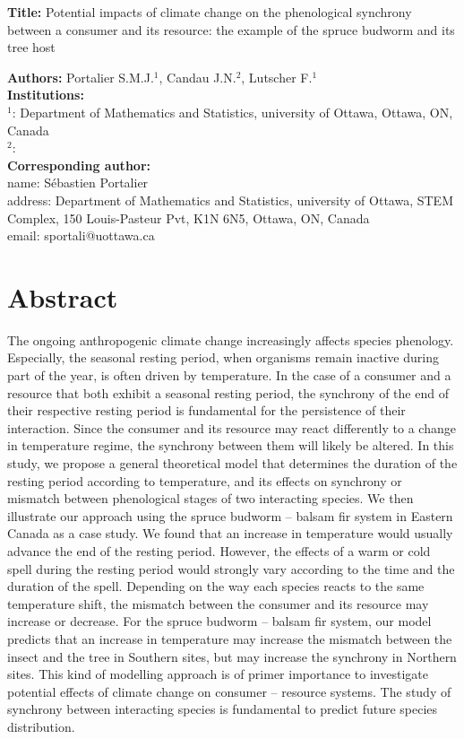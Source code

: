 \documentclass[12 pt]{article}
\begin{document}
\begin{Large}
\noindent \textbf{Title:} Potential impacts of climate change on the phenological synchrony between a consumer and its resource: the example of the spruce budworm and its tree host 
\end{Large}
\vspace{1 cm}

\noindent \textbf{Authors:} Portalier S.M.J.$^{1}$, Candau J.N.$^2$, Lutscher F.$^1$ \\
\textbf{Institutions:} \\
$^1$: Department of Mathematics and Statistics, university of Ottawa, Ottawa, ON, Canada \\
$^2$: \\
\textbf{Corresponding author:} \\
name: S\'ebastien Portalier \\
address: Department of Mathematics and Statistics, university of Ottawa, STEM Complex, 150 Louis-Pasteur Pvt, K1N 6N5, Ottawa, ON, Canada \\
email: sportali@uottawa.ca \\

\clearpage

\section*{Abstract}
The ongoing anthropogenic climate change increasingly affects species phenology. Especially, the seasonal resting period, when organisms remain inactive during part of the year, is often driven by temperature. In the case of a consumer and a resource that both exhibit a seasonal resting period, the synchrony of the end of their respective resting period is fundamental for the persistence of their interaction. Since the consumer and its resource may react differently to a change in temperature regime, the synchrony between them will likely be altered. In this study, we propose a general theoretical model that determines the duration of the resting period according to temperature, and its effects on synchrony or mismatch between phenological stages of two interacting species. We then illustrate our approach using the spruce budworm – balsam fir system in Eastern Canada as a case study. We found that an increase in temperature would usually advance the end of the resting period. However, the effects of a warm or cold spell during the resting period would strongly vary according to the time and the duration of the spell. Depending on the way each species reacts to the same temperature shift, the mismatch between the consumer and its resource may increase or decrease. For the spruce budworm – balsam fir system, our model predicts that an increase in temperature may increase the mismatch between the insect and the tree in Southern sites, but may increase the synchrony in Northern sites. This kind of modelling approach is of primer importance to investigate potential effects of climate change on consumer – resource systems. The study of synchrony between interacting species is fundamental to predict future species distribution.\par
\end{document}
